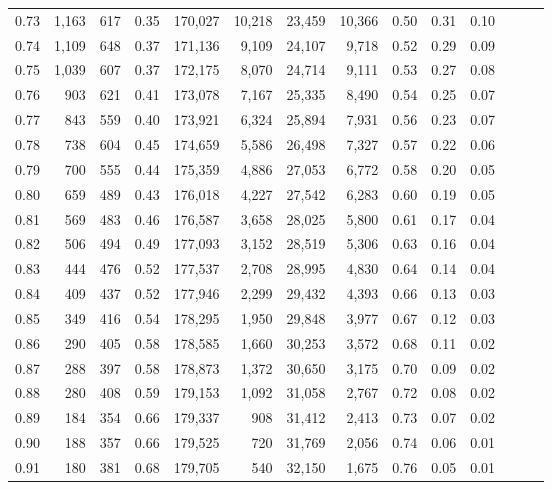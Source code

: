 \begin{tabular}{rrrrrrrrrrrrrr}
0.73 &  1,163 &  617 &  0.35 &  170,027 &   10,218 &  23,459 &  10,366 &  0.50 &  0.31 &      0.10 \\
0.74 &  1,109 &  648 &  0.37 &  171,136 &    9,109 &  24,107 &   9,718 &  0.52 &  0.29 &      0.09 \\
0.75 &  1,039 &  607 &  0.37 &  172,175 &    8,070 &  24,714 &   9,111 &  0.53 &  0.27 &      0.08 \\
0.76 &    903 &  621 &  0.41 &  173,078 &    7,167 &  25,335 &   8,490 &  0.54 &  0.25 &      0.07 \\
0.77 &    843 &  559 &  0.40 &  173,921 &    6,324 &  25,894 &   7,931 &  0.56 &  0.23 &      0.07 \\
0.78 &    738 &  604 &  0.45 &  174,659 &    5,586 &  26,498 &   7,327 &  0.57 &  0.22 &      0.06 \\
0.79 &    700 &  555 &  0.44 &  175,359 &    4,886 &  27,053 &   6,772 &  0.58 &  0.20 &      0.05 \\
0.80 &    659 &  489 &  0.43 &  176,018 &    4,227 &  27,542 &   6,283 &  0.60 &  0.19 &      0.05 \\
0.81 &    569 &  483 &  0.46 &  176,587 &    3,658 &  28,025 &   5,800 &  0.61 &  0.17 &      0.04 \\
0.82 &    506 &  494 &  0.49 &  177,093 &    3,152 &  28,519 &   5,306 &  0.63 &  0.16 &      0.04 \\
0.83 &    444 &  476 &  0.52 &  177,537 &    2,708 &  28,995 &   4,830 &  0.64 &  0.14 &      0.04 \\
0.84 &    409 &  437 &  0.52 &  177,946 &    2,299 &  29,432 &   4,393 &  0.66 &  0.13 &      0.03 \\
0.85 &    349 &  416 &  0.54 &  178,295 &    1,950 &  29,848 &   3,977 &  0.67 &  0.12 &      0.03 \\
0.86 &    290 &  405 &  0.58 &  178,585 &    1,660 &  30,253 &   3,572 &  0.68 &  0.11 &      0.02 \\
0.87 &    288 &  397 &  0.58 &  178,873 &    1,372 &  30,650 &   3,175 &  0.70 &  0.09 &      0.02 \\
0.88 &    280 &  408 &  0.59 &  179,153 &    1,092 &  31,058 &   2,767 &  0.72 &  0.08 &      0.02 \\
0.89 &    184 &  354 &  0.66 &  179,337 &      908 &  31,412 &   2,413 &  0.73 &  0.07 &      0.02 \\
0.90 &    188 &  357 &  0.66 &  179,525 &      720 &  31,769 &   2,056 &  0.74 &  0.06 &      0.01 \\
0.91 &    180 &  381 &  0.68 &  179,705 &      540 &  32,150 &   1,675 &  0.76 &  0.05 &      0.01 \\

\end{tabular}
